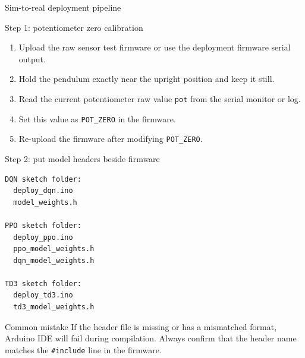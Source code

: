 \documentclass[aspectratio=169]{beamer}
\begin{document}
\begin{frame}{Sim-to-real deployment pipeline}
\begin{center}
\end{center}

\end{frame}


\begin{frame}{Step 1: potentiometer zero calibration}
\begin{enumerate}
    \item Upload the raw sensor test firmware or use the deployment firmware serial output.
    \vspace{0.2cm}
    \item Hold the pendulum exactly near the upright position and keep it still.
    \vspace{0.2cm}
    \item Read the current potentiometer raw value \texttt{pot} from the serial monitor or log.
    \vspace{0.2cm}
    \item Set this value as \texttt{POT\_ZERO} in the firmware.
    \vspace{0.2cm}
    \item Re-upload the firmware after modifying \texttt{POT\_ZERO}.
\end{enumerate}


\end{frame}

\begin{frame}[fragile]{Step 2: put model headers beside firmware}
\begin{lstlisting}[basicstyle=\ttfamily\scriptsize]
DQN sketch folder:
  deploy_dqn.ino
  model_weights.h

PPO sketch folder:
  deploy_ppo.ino
  ppo_model_weights.h
  dqn_model_weights.h

TD3 sketch folder:
  deploy_td3.ino
  td3_model_weights.h
\end{lstlisting}

\vspace{0.15cm}
\begin{alertblock}{Common mistake}
\small
If the header file is missing or has a mismatched format, Arduino IDE will fail during compilation. Always confirm that the header name matches the \texttt{\#include} line in the firmware.
\end{alertblock}
\end{frame}
\end{document}
